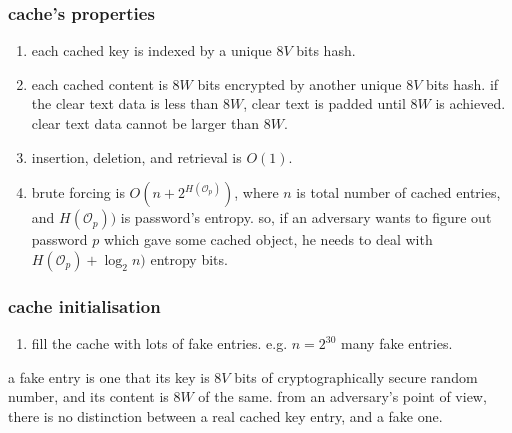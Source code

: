 \documentclass[twocolumn]{article}
\begin{document}
\subsubsection{cache's properties}
\begin{enumerate}
    \item each cached key is indexed by a unique $8V$ bits hash.

    \item each cached content is $8W$ bits encrypted by another unique $8V$
    bits hash.  if the clear text data is less than $8W$, clear text is
    padded until $8W$ is achieved.  clear text data cannot be larger than
    $8W$.

    \item insertion, deletion, and retrieval is $O(1)$.

    \item brute forcing is $O(n + 2^{H(\mathcal{O}_p)})$, where $n$ is
    total number of cached entries, and $H(\mathcal{O}_p))$ is password's
    entropy.  so, if an adversary wants to figure out password $p$ which
    gave some cached object, he needs to deal with $H(\mathcal{O}_p) +
    \log_2 n)$ entropy bits.
\end{enumerate}

\subsubsection{cache initialisation}
\begin{enumerate}
    \item fill the cache with lots of fake entries.  e.g. $n=2^{30}$ many
    fake entries.
\end{enumerate}

a fake entry is one that its key is $8V$ bits of cryptographically secure
random number, and its content is $8W$ of the same.  from an adversary's
point of view, there is no distinction between a real cached key entry, and
a fake one.
\end{document}
